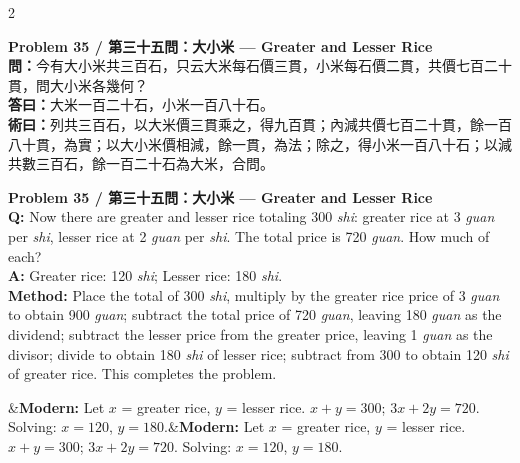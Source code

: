 \documentclass[11pt,a4paper]{article}
\newcommand{\bilingualproblem}[4]{%
  \begin{paracol}{2}
  \begin{leftcolumn}
  \noindent\textbf{\color{problemcolor}#1}\\[0.2cm]
  #2
  \end{leftcolumn}
  \switchcolumn
  \noindent\textbf{\color{problemcolor}#1}\\[0.2cm]
  #3
  \end{paracol}
  \ifx&#4&\else\vspace{0.3cm}\noindent#4\fi
  \vspace{0.5cm}
}
\newcommand{\wen}[1]{\textcolor{problemcolor}{\textbf{問：}}#1}
\newcommand{\da}[1]{\textcolor{answercolor}{\textbf{答曰：}}#1}
\newcommand{\shu}[1]{\textcolor{methodcolor}{\textbf{術曰：}}#1}
\newcommand{\wenen}[1]{\textcolor{problemcolor}{\textbf{Q:}} #1}
\newcommand{\daen}[1]{\textcolor{answercolor}{\textbf{A:}} #1}
\newcommand{\shuen}[1]{\textcolor{methodcolor}{\textbf{Method:}} #1}
\begin{document}
\bilingualproblem{Problem 35 / 第三十五問：大小米 --- Greater and Lesser Rice}{
\wen{今有大小米共三百石，只云大米每石價三貫，小米每石價二貫，共價七百二十貫，問大小米各幾何？}\\[0.2cm]
\da{大米一百二十石，小米一百八十石。}\\[0.2cm]
\shu{列共三百石，以大米價三貫乘之，得九百貫；內減共價七百二十貫，餘一百八十貫，為實；以大小米價相減，餘一貫，為法；除之，得小米一百八十石；以減共數三百石，餘一百二十石為大米，合問。}
}{
\wenen{Now there are greater and lesser rice totaling 300 \textit{shi}: greater rice at 3 \textit{guan} per \textit{shi}, lesser rice at 2 \textit{guan} per \textit{shi}. The total price is 720 \textit{guan}. How much of each?}\\[0.2cm]
\daen{Greater rice: 120 \textit{shi}; Lesser rice: 180 \textit{shi}.}\\[0.2cm]
\shuen{Place the total of 300 \textit{shi}, multiply by the greater rice price of 3 \textit{guan} to obtain 900 \textit{guan}; subtract the total price of 720 \textit{guan}, leaving 180 \textit{guan} as the dividend; subtract the lesser price from the greater price, leaving 1 \textit{guan} as the divisor; divide to obtain 180 \textit{shi} of lesser rice; subtract from 300 to obtain 120 \textit{shi} of greater rice. This completes the problem.}
}{\textbf{Modern:} Let $x$ = greater rice, $y$ = lesser rice. $x + y = 300$; $3x + 2y = 720$. Solving: $x = 120$, $y = 180$.}
\end{document}
